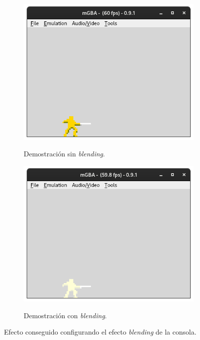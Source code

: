\begin{figure}[h]
     \centering
     \begin{subfigure}[b]{0.45\textwidth}
         \centering
         \includegraphics[width=\textwidth]{capitulos/capitulo3/blending_1.png}
         \label{fig:blending_1}
	     \caption{Demostración sin \textit{blending}.}
     \end{subfigure}
     \hfill
     \begin{subfigure}[b]{0.45\textwidth}
         \centering
         \includegraphics[width=\textwidth]{capitulos/capitulo3/blending_2.png}
         \label{fig:blending_2}
	     \caption{Demostración con \textit{blending}.}
     \end{subfigure}
	\caption{Efecto conseguido configurando el efecto \textit{blending} de la consola.}\label{fig:blending}
\end{figure}
\FloatBarrier{}

